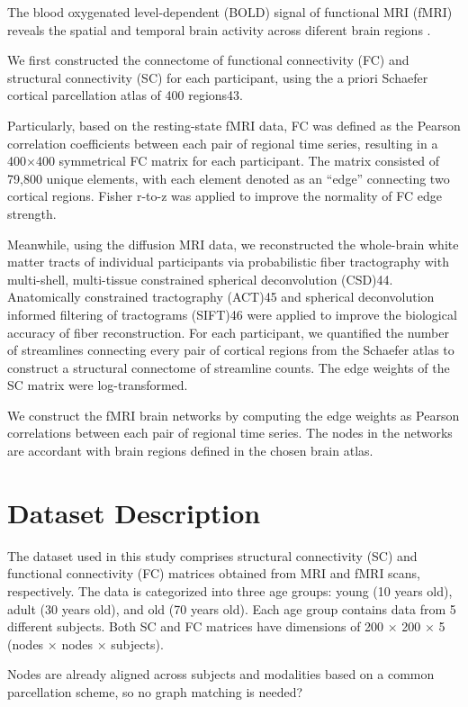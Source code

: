 The blood oxygenated level-dependent (BOLD) signal of functional MRI
(fMRI) reveals the spatial and temporal brain activity across diferent
brain regions \cite{Zhao2022}. 

We first constructed the connectome of functional connectivity (FC) 
and structural connectivity (SC) for each participant, using the a 
priori Schaefer cortical parcellation atlas of 400 regions43. 

Particularly, based on the resting-state fMRI data, FC was defined as 
the Pearson correlation coefficients between each pair of regional 
time series, resulting in a 400×400 symmetrical FC matrix for each 
participant. The matrix consisted of 79,800 unique elements, with 
each element denoted as an “edge” connecting two cortical regions. 
Fisher r-to-z was applied to improve the normality of FC edge strength. 

Meanwhile, using the diffusion MRI data, we reconstructed the whole-brain 
white matter tracts of individual participants via probabilistic fiber 
tractography with multi-shell, multi-tissue constrained spherical 
deconvolution (CSD)44. Anatomically constrained tractography (ACT)45 and 
spherical deconvolution informed filtering of tractograms (SIFT)46 were 
applied to improve the biological accuracy of fiber reconstruction. 
For each participant, we quantified the number of streamlines connecting 
every pair of cortical regions from the Schaefer atlas to construct a 
structural connectome of streamline counts. 
The edge weights of the SC matrix were log-transformed.
\cite{Chen2024}


We construct the fMRI brain networks by computing the edge weights
as Pearson correlations between each pair of regional time
series. The nodes in the networks are accordant with brain
regions defined in the chosen brain atlas. \cite{Zhang2022}

\section{Dataset Description}
The dataset used in this study comprises structural connectivity (SC) and functional connectivity (FC) matrices 
obtained from MRI and fMRI scans, respectively. The data is categorized into three age groups: 
young (10 years old), adult (30 years old), and old (70 years old). Each age group contains data from 5 different subjects.
Both SC and FC matrices have dimensions of 200 $\times$ 200 $\times$ 5 (nodes $\times$ nodes $\times$ subjects).

Nodes are already aligned across subjects and modalities based on a 
common parcellation scheme, so no graph matching is needed? \cite{Puxeddu2022}
